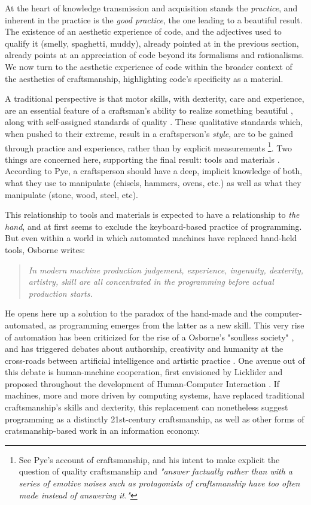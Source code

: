 At the heart of knowledge transmission and acquisition stands the \emph{practice}, and inherent in the practice is the \emph{good practice}, the one leading to a beautiful result. The existence of an aesthetic experience of code, and the adjectives used to qualify it (smelly, spaghetti, muddy), already pointed at in the previous section, already points at an appreciation of code beyond its formalisms and rationalisms. We now turn to the aesthetic experience of code within the broader context of the aesthetics of craftsmanship, highlighting code's specificity as a material.

A traditional perspective is that motor skills, with dexterity, care and experience, are an essential feature of a craftsman's ability to realize something beautiful \citep{osborne_aesthetic_1977}, along with self-assigned standards of quality \citep{pye_nature_2008,sennett_craftsman_2009}. These qualitative standards which, when pushed to their extreme, result in a craftsperson's \emph{style}, are to be gained through practice and experience, rather than by explicit measurements \citep{pye_nature_2008} \footnote{See Pye's account of craftsmanship, and his intent to make explicit the question of quality craftsmanship and \emph{"answer factually rather than with a series of emotive noises such as protagonists of craftsmanship have too often made instead of answering it."}}. Two things are concerned here, supporting the final result: tools and materials \citep{pye_nature_2008}. According to Pye, a craftsperson should have a deep, implicit knowledge of both, what they use to manipulate (chisels, hammers, ovens, etc.) as well as what they manipulate (stone, wood, steel, etc).

This relationship to tools and materials is expected to have a relationship to \emph{the hand}, and at first seems to exclude the keyboard-based practice of programming. But even within a world in which automated machines have replaced hand-held tools, Osborne writes:

\begin{quote}
  \textit{In modern machine production judgement, experience, ingenuity, dexterity, artistry, skill are all concentrated in the programming before actual production starts. \citep{osborne_aesthetic_1977}}
\end{quote}

He opens here up a solution to the paradox of the hand-made and the computer-automated, as programming emerges from the latter as a new skill. This very rise of automation has been criticized for the rise of a Osborne's "soulless society" \citep{osborne_aesthetic_1977}, and has triggered debates about authorship, creativity and humanity at the cross-roads between artificial intelligence and artistic practice \citep{mazzone_art_2019}. One avenue out of this debate is human-machine cooperation, first envisioned by Licklider and proposed throughout the development of Human-Computer Interaction \citep{licklider_mancomputer_1960,grudin_tool_2016}. If machines, more and more driven by computing systems, have replaced traditional craftsmanship's skills and dexterity, this replacement can nonetheless suggest programming as a distinctly 21st-century craftsmanship, as well as other forms of cratsmanship-based work in an information economy.

